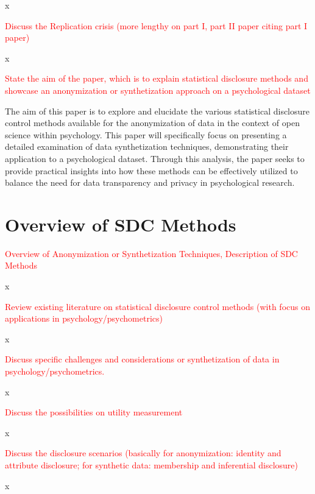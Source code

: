 \documentclass{article}
\begin{document}
x

\textcolor{red}{Discuss the Replication crisis (more lengthy on part I, part II paper citing part I paper)}

x

\textcolor{red}{State the aim of the paper, which is to explain statistical disclosure methods and showcase an anonymization or synthetization approach on a psychological dataset}

The aim of this paper is to explore and elucidate the various statistical disclosure control
methods available for the anonymization of data in the context of open science within psychology.
This paper will specifically focus on presenting a detailed examination of data
synthetization techniques, demonstrating their application to a psychological dataset. Through this analysis, the paper seeks to provide practical insights into how these methods can be effectively utilized to balance the need for data transparency and privacy in psychological research.

\section{Overview of SDC Methods}

\textcolor{red}{Overview of Anonymization or Synthetization Techniques, Description of SDC Methods}

x

\textcolor{red}{Review existing literature on statistical disclosure control methods (with focus on applications in psychology/psychometrics)}

x

\textcolor{red}{Discuss specific challenges and considerations or synthetization of data in psychology/psychometrics.}

x

\textcolor{red}{Discuss the possibilities on utility measurement}

x

\textcolor{red}{Discuss the disclosure scenarios (basically for anonymization: identity and attribute disclosure; for synthetic data: membership and inferential disclosure)}

x
\end{document}
